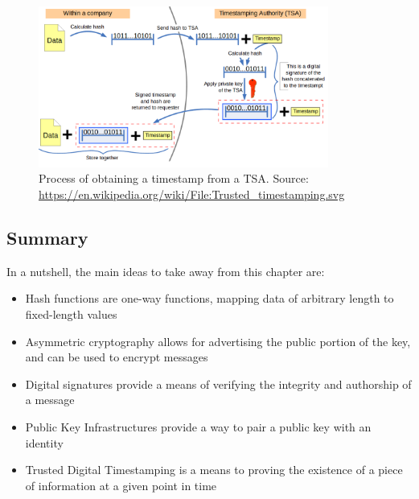 \begin{figure}
    \centering
    \includegraphics[width=0.85\textwidth]{images/timestamping.png}
    \caption{Process of obtaining a timestamp from a \acrfull{TSA}.
    Source: \url{https://en.wikipedia.org/wiki/File:Trusted_timestamping.svg}}
    \label{fig:timestamping}
\end{figure}

\subsection{Summary}
In a nutshell, the main ideas to take away from this chapter are:
\begin{itemize}
    \item Hash functions are one-way functions, mapping data of arbitrary length to fixed-length values
    \item Asymmetric cryptography allows for advertising the public portion of the key, and can be used to encrypt messages
    \item Digital signatures provide a means of verifying the integrity and authorship of a message
    \item Public Key Infrastructures provide a way to pair a public key with an identity
    \item Trusted Digital Timestamping is a means to proving the existence of a piece of information at a given point in time
\end{itemize}
